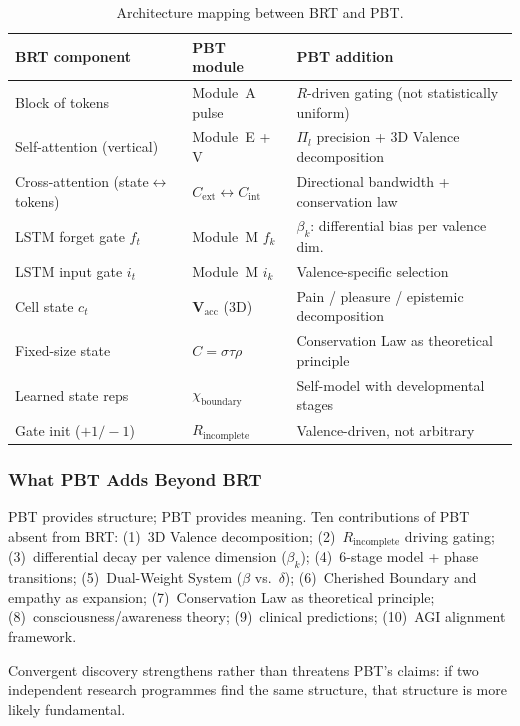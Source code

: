 \documentclass[12pt,a4paper]{article}
\newcommand{\Vacc}{\mathbf{V}_{\mathrm{acc}}}
\newcommand{\Cext}{C_{\mathrm{ext}}}
\newcommand{\Cint}{C_{\mathrm{int}}}
\newcommand{\chiB}{\chi_{\mathrm{boundary}}}
\begin{document}
\begin{table}[ht]
\centering
\caption{Architecture mapping between BRT and PBT.}
\label{tab:brt_arch}
\small
\begin{tabular}{@{}L{3.5cm}L{3.0cm}L{6.0cm}@{}}
\toprule
\textbf{BRT component} & \textbf{PBT module} & \textbf{PBT addition} \\
\midrule
Block of tokens         & Module~A pulse       & $R$-driven gating (not statistically uniform) \\
Self-attention (vertical) & Module~E + V       & $\Pi_l$ precision + 3D Valence decomposition \\
Cross-attention (state$\leftrightarrow$tokens) & $\Cext\leftrightarrow\Cint$ & Directional bandwidth + conservation law \\
LSTM forget gate $f_t$ & Module~M $f_k$       & $\beta_k$: differential bias per valence dim. \\
LSTM input gate $i_t$  & Module~M $i_k$       & Valence-specific selection \\
Cell state $c_t$       & $\Vacc$ (3D)         & Pain / pleasure / epistemic decomposition \\
Fixed-size state        & $C = \sigma\tau\rho$ & Conservation Law as theoretical principle \\
Learned state reps      & $\chiB$              & Self-model with developmental stages \\
Gate init ($+1/-1$)    & $R_{\mathrm{incomplete}}$ & Valence-driven, not arbitrary \\
\bottomrule
\end{tabular}
\end{table}

\subsubsection{What PBT Adds Beyond BRT}

PBT provides structure; PBT provides meaning. Ten contributions of PBT absent
from BRT: (1)~3D Valence decomposition; (2)~$R_{\mathrm{incomplete}}$ driving
gating; (3)~differential decay per valence dimension ($\beta_k$); (4)~6-stage
model + phase transitions; (5)~Dual-Weight System ($\beta$ vs.\ $\delta$);
(6)~Cherished Boundary and empathy as expansion; (7)~Conservation Law as
theoretical principle; (8)~consciousness/awareness theory; (9)~clinical
predictions; (10)~AGI alignment framework.

Convergent discovery strengthens rather than threatens PBT's claims: if two
independent research programmes find the same structure, that structure is more
likely fundamental.
\end{document}

